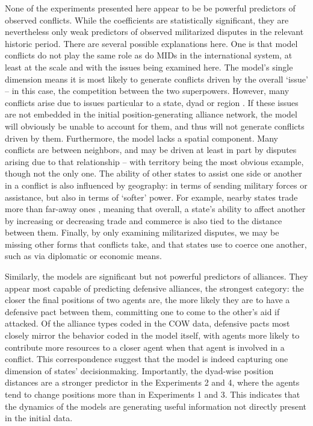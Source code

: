 None of the experiments presented here appear to be be powerful predictors of observed conflicts. While the coefficients are statistically significant, they are nevertheless only weak predictors of observed militarized disputes in the relevant historic period. There are several possible explanations here. One is that model conflicts do not play the same role as do MIDs in the international system, at least at the scale and with the issues being examined here. The model's single dimension means it is most likely to generate conflicts driven by the overall `issue' -- in this case, the competition between the two superpowers. However, many conflicts arise due to issues particular to a state, dyad or region \citep{senese_1996}. If these issues are not embedded in the initial position-generating alliance network, the model will obviously be unable to account for them, and thus will not generate conflicts driven by them. Furthermore, the model lacks a spatial component. Many conflicts are between neighbors, and may be driven at least in part by disputes arising due to that relationship -- with territory being the most obvious example, though not the only one. The ability of other states to assist one side or another in a conflict is also influenced by geography: in terms of sending military forces or assistance, but also in terms of `softer' power. For example, nearby states trade more than far-away ones \citep{ramanarayanan_2011}, meaning that overall, a state's ability to affect another by increasing or decreasing trade and commerce is also tied to the distance between them. Finally, by only examining militarized disputes, we may be missing other forms that conflicts take, and that states use to coerce one another, such as via diplomatic or economic means.

Similarly, the models are significant but not powerful predictors of alliances. They appear most capable of predicting defensive alliances, the strongest category: the closer the final positions of two agents are, the more likely they are to have a defensive pact between them, committing one to come to the other's aid if attacked. Of the alliance types coded in the COW data, defensive pacts most closely mirror the behavior coded in the model itself, with agents more likely to contribute more resources to a closer agent when that agent is involved in a conflict. This correspondence suggest that the model is indeed capturing one dimension of states' decisionmaking. Importantly, the dyad-wise position distances are a stronger predictor in the Experiments 2 and 4, where the agents tend to change positions more than in Experiments 1 and 3. This indicates that the dynamics of the models are generating useful information not directly present in the initial data.

